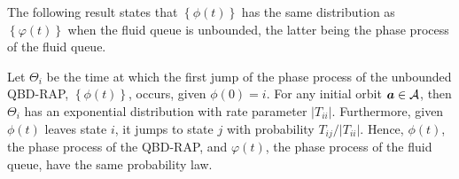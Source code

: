 The following result states that \(\left\{{\phi}(t)\right\}\) has the same distribution as \(\left\{{\varphi}(t)\right\}\) when the fluid queue is unbounded, the latter being the phase process of the fluid queue. 
\begin{thm}\label{thm: 1}
	Let \(\Theta_i\) be the time at which the first jump of the phase process of the unbounded QBD-RAP, \(\left\{{\phi}(t)\right\}\), occurs, given \(\phi(0)=i\). For any initial orbit \(\boldsymbol a\in\mathcal A\), then \(\Theta_i\) has an exponential distribution with rate parameter \(|T_{ii}|\). Furthermore, given \({\phi}(t)\) leaves state \(i\), it jumps to state \(j\) with probability \(T_{ij}/|T_{ii}|\). Hence, \({\phi}(t)\), the phase process of the QBD-RAP, and \(\varphi(t)\), the phase process of the fluid queue, have the same probability law. 
\end{thm}
